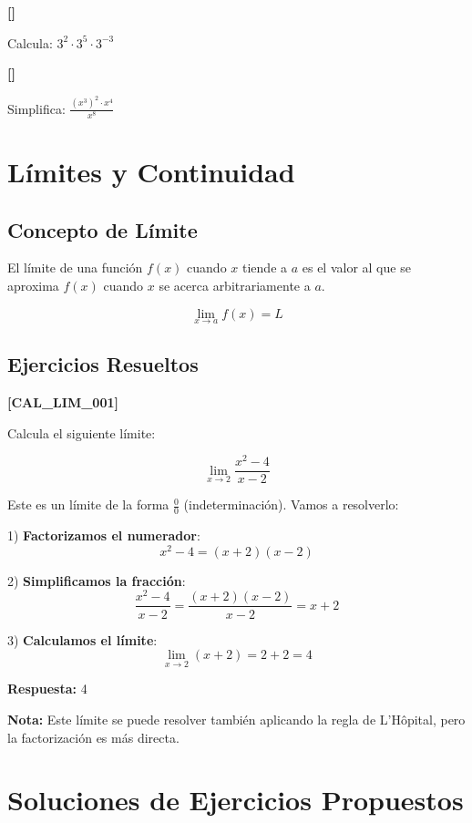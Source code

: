 \documentclass[12pt,a4paper]{book}
\newenvironment{ejercicio}[1][]{%
    \begin{trivlist}\item[\hskip \labelsep {\bfseries Ejercicio.}]
    \if\relax\detokenize{#1}\relax
    \else
        \textbf{[#1]}
    \fi
}{%
    \end{trivlist}
}
\newenvironment{solucion}{%
    \begin{trivlist}\item[\hskip \labelsep {\bfseries Solución.}]
    \color{blue}
}{%
    \color{black}
    \end{trivlist}
}
\begin{document}
\begin{ejercicio}
Calcula: $3^2 \cdot 3^5 \cdot 3^{-3}$
\end{ejercicio}

\begin{ejercicio}
Simplifica: $\frac{(x^3)^2 \cdot x^4}{x^8}$
\end{ejercicio}

\chapter{Límites y Continuidad}

\section{Concepto de Límite}

El límite de una función $f(x)$ cuando $x$ tiende a $a$ es el valor al que se aproxima $f(x)$ cuando $x$ se acerca arbitrariamente a $a$.

$$\lim_{x \to a} f(x) = L$$

\section{Ejercicios Resueltos}

\begin{ejercicio}[CAL\_LIM\_001]
Calcula el siguiente límite:

$$\lim_{x \to 2} \frac{x^2 - 4}{x - 2}$$

\begin{solucion}
Este es un límite de la forma $\frac{0}{0}$ (indeterminación). Vamos a resolverlo:

1) \textbf{Factorizamos el numerador}:
   $$x^2 - 4 = (x + 2)(x - 2)$$

2) \textbf{Simplificamos la fracción}:
   $$\frac{x^2 - 4}{x - 2} = \frac{(x + 2)(x - 2)}{x - 2} = x + 2$$

3) \textbf{Calculamos el límite}:
   $$\lim_{x \to 2} (x + 2) = 2 + 2 = 4$$

\textbf{Respuesta:} 4

\textbf{Nota:} Este límite se puede resolver también aplicando la regla de L'Hôpital, pero la factorización es más directa.
\end{solucion}
\end{ejercicio}

\appendix

\chapter{Soluciones de Ejercicios Propuestos}
\end{document}
